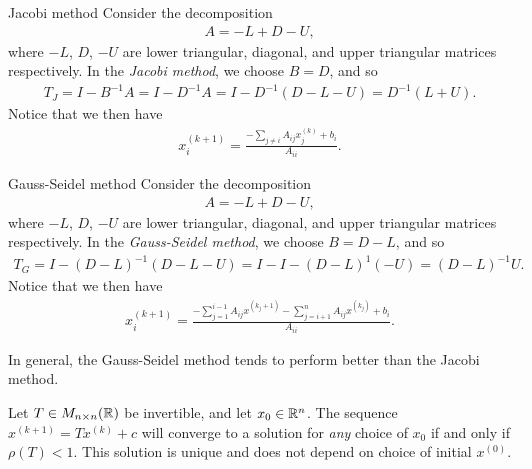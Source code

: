 \begin{defn}{Jacobi method}\proofbreak
    Consider the decomposition
    \begin{align*}
        A = -L + D - U,
    \end{align*}
    where $-L$, $D$, $-U$ are lower triangular, diagonal, and upper triangular matrices respectively. In the \emph{Jacobi method}, we choose $B = D$, and so
    \begin{align*}
        T_{J} = I - B^{-1}A = I - D^{-1}A = I-D^{-1}(D - L - U) = D^{-1}(L + U).
    \end{align*}
    Notice that we then have
    \begin{align*}
        x^{(k + 1)}_{i} = \frac{-\sum_{j\neq i}A_{ij}x^{(k)}_j + b_i}{A_{ii}}.
    \end{align*}
\end{defn}

\begin{defn}{Gauss-Seidel method}\proofbreak
    Consider the decomposition
    \begin{align*}
        A = -L + D - U,
    \end{align*}
    where $-L$, $D$, $-U$ are lower triangular, diagonal, and upper triangular matrices respectively. In the \emph{Gauss-Seidel method}, we choose $B = D - L$, and so
    \begin{align*}
        T_{G} = I - \left(D - L\right)^{-1}\left(D - L - U\right) = I - I - \left(D - L\right)^{1}\left(-U\right) = \left(D-L\right)^{-1}U.
    \end{align*}
    Notice that we then have
    \begin{align*}
        x^{(k + 1)}_{i} = \frac{-\sum_{j=1}^{i-1}A_{ij}x^{(k_j+1)} - \sum_{j= i+1}^{n}A_{ij}x^{(k_j)} + b_i}{A_{ii}}.
    \end{align*}
\end{defn}

\begin{rmk}
    In general, the Gauss-Seidel method tends to perform better than the Jacobi method.
\end{rmk}

\begin{thm}\label{fixed-point-convergence}
    Let $T \in M_{n \times n}(\mathbb{R})$ be invertible, and let $x_0 \in \mathbb{R}^n$. The sequence $x^{(k+1)} = Tx^{(k)} + c$ will converge to a solution for \emph{any} choice of $x_0$ if and only if $\rho(T) < 1$. This solution is unique and does not depend on choice of initial $x^{(0)}$.
\end{thm}

